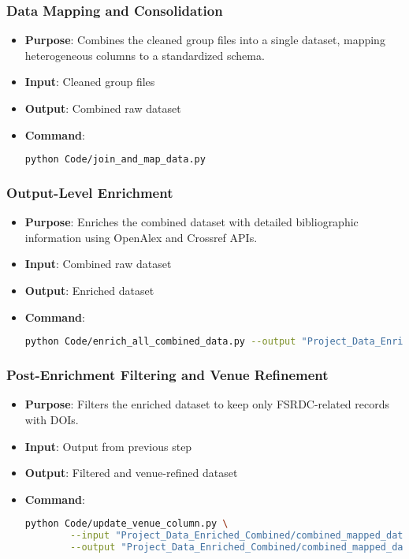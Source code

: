 \documentclass[12pt]{article}
\begin{document}
\subsubsection{Data Mapping and Consolidation}
\begin{itemize}
    \item \textbf{Purpose}: Combines the cleaned group files into a single dataset, mapping heterogeneous columns to a standardized schema.
    \item \textbf{Input}: Cleaned group files
    \item \textbf{Output}: Combined raw dataset
    \item \textbf{Command}:
    \begin{lstlisting}[language=bash]
    python Code/join_and_map_data.py
    \end{lstlisting}
\end{itemize}

\subsubsection{Output-Level Enrichment}
\begin{itemize}
    \item \textbf{Purpose}: Enriches the combined dataset with detailed bibliographic information using OpenAlex and Crossref APIs.
    \item \textbf{Input}: Combined raw dataset
    \item \textbf{Output}: Enriched dataset
    \item \textbf{Command}:
    \begin{lstlisting}[language=bash]
    python Code/enrich_all_combined_data.py --output "Project_Data_Enriched_Combined/combined_mapped_data_raw_enriched_final.csv"
    \end{lstlisting}
\end{itemize}

\subsubsection{Post-Enrichment Filtering and Venue Refinement}
\begin{itemize}
    \item \textbf{Purpose}: Filters the enriched dataset to keep only FSRDC-related records with DOIs.
    \item \textbf{Input}: Output from previous step
    \item \textbf{Output}: Filtered and venue-refined dataset
    \item \textbf{Command}:
    \begin{lstlisting}[language=bash]
    python Code/update_venue_column.py \
        --input "Project_Data_Enriched_Combined/combined_mapped_data_raw_enriched_final.csv" \
        --output "Project_Data_Enriched_Combined/combined_mapped_data_raw_enriched_final_final.csv"
    \end{lstlisting}
\end{itemize}
\end{document}
